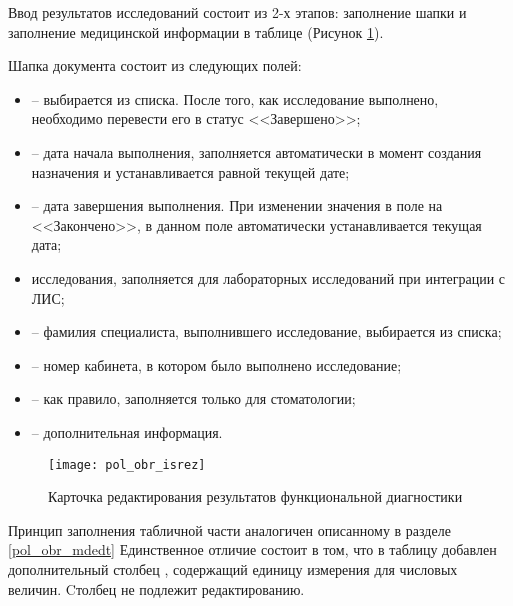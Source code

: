 Ввод результатов исследований состоит из 2-х этапов: заполнение шапки и заполнение медицинской информации в таблице (Рисунок \ref{img_pol_obr_isrez}).

Шапка документа состоит из следующих полей:
\begin{itemize}
 \item {} – выбирается из списка. После того, как  исследование выполнено, необходимо перевести его в статус <<Завершено>>;
 \item {} – дата начала выполнения, заполняется автоматически в момент создания назначения и устанавливается равной текущей дате;
 \item {} – дата завершения выполнения. При изменении значения в поле  на <<Закончено>>, в данном поле автоматически устанавливается текущая дата;
 \item {} исследования, заполняется для лабораторных исследований при интеграции с ЛИС;
 \item {} – фамилия специалиста, выполнившего исследование, выбирается из списка;
 \item {} – номер кабинета, в котором было выполнено исследование;
 \item {} – как правило, заполняется только для стоматологии;
 \item {} – дополнительная информация.
\end{itemize}

 \begin{figure}[ht]\centering
   \texttt{[image: pol\_obr\_isrez]}
   \caption{Карточка редактирования результатов функциональной диагностики}
   \label{img_pol_obr_isrez}
 \end{figure}
 
Принцип заполнения табличной части аналогичен описанному в разделе \ref{pol_obr_mdedt} Единственное отличие состоит в том, что в таблицу добавлен дополнительный столбец , содержащий единицу измерения для числовых величин. Cтолбец  не подлежит редактированию.


